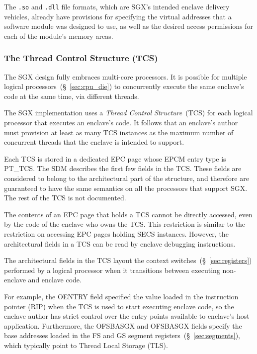 The \texttt{.so} and \texttt{.dll} file formats, which are SGX's intended
enclave delivery vehicles, already have provisions for specifying the virtual
addresses that a software module was designed to use, as well as the desired
access permissions for each of the module's memory areas.


\subsubsection{The Thread Control Structure (TCS)}
\label{sec:sgx_tcs}


The SGX design fully embraces multi-core processors. It is possible for
multiple logical processors~(\S~\ref{sec:cpu_die}) to concurrently execute the
same enclave's code at the same time, via different threads.

The SGX implementation uses a \textit{Thread Control Structure}~(TCS) for each
logical processor that executes an enclave's code. It follows that an enclave's
author must provision at least as many TCS instances as the maximum number of
concurrent threads that the enclave is intended to support.

Each TCS is stored in a dedicated EPC page whose EPCM entry type is PT\_TCS.
The SDM describes the first few fields in the TCS. These fields are considered
to belong to the architectural part of the structure, and therefore are
guaranteed to have the same semantics on all the processors that support SGX.
The rest of the TCS is not documented.


The contents of an EPC page that holds a TCS cannot be directly accessed, even
by the code of the enclave who owns the TCS. This restriction is similar to the
restriction on accessing EPC pages holding SECS instances. However, the
architectural fields in a TCS can be read by enclave debugging instructions.

The architectural fields in the TCS layout  the context
switches~(\S~\ref{sec:registers}) performed by a logical processor when it
transitions between executing non-enclave and enclave code.

For example, the OENTRY field specified the value loaded in the instruction
pointer (RIP) when the TCS is used to start executing enclave code, so the
enclave author has strict control over the entry points available to enclave's
host application. Furthermore, the OFSBASGX and OFSBASGX fields specify the
base addresses loaded in the FS and GS segment
registers~(\S~\ref{sec:segments}), which typically point to Thread Local
Storage (TLS).


